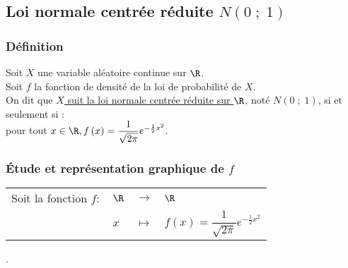 \ifdefined\COMPLETE
\else
    
    
\fi


\subsection{Loi normale centrée réduite $N\left(0 \; ; \; 1\right)$}

\subsubsection{Définition}

Soit $X$ une variable aléatoire continue sur $\R$. \\
Soit $f$ la fonction de densité de la loi de probabilité de $X$. \\

On dit que \underline{$X$ suit la loi normale centrée réduite sur $\R$}, noté $N\left(0 \; ; \; 1\right)$, si et seulement si : \\
pour tout $x \in \R, f\left(x\right) = \dfrac{1}{\sqrt{2\pi}}e^{-\frac{1}{2}x^2}$.

\subsubsection{Étude et représentation graphique de $f$}

\begin{tabular}{llll}
\hspace*{-.3cm} Soit la fonction $f:$ & $\R$ & $\longrightarrow$ & $\R$ \\
& $x$ & $\longmapsto$ & $f(x) = \dfrac{1}{\sqrt{2\pi}}e^{-\frac{1}{2}x^2}$
\end{tabular}. \\

